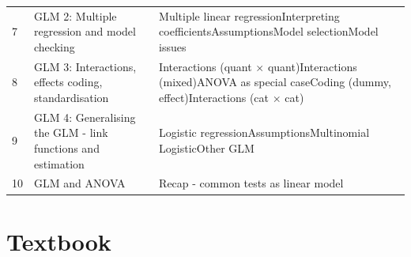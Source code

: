 \documentclass[]{book}
\begin{document}
\begin{longtable}[]{@{}lll@{}}
\begin{minipage}[t]{0.30\columnwidth}
7\strut
\end{minipage} & \begin{minipage}[t]{0.30\columnwidth}\raggedright
GLM 2: Multiple regression and model checking\strut
\end{minipage} & \begin{minipage}[t]{0.30\columnwidth}\raggedright
Multiple linear regressionInterpreting coefficientsAssumptionsModel selectionModel issues\strut
\end{minipage}\tabularnewline
\begin{minipage}[t]{0.30\columnwidth}\raggedright
8\strut
\end{minipage} & \begin{minipage}[t]{0.30\columnwidth}\raggedright
GLM 3: Interactions, effects coding, standardisation\strut
\end{minipage} & \begin{minipage}[t]{0.30\columnwidth}\raggedright
Interactions (quant \(\times\) quant)Interactions (mixed)ANOVA as special caseCoding (dummy, effect)Interactions (cat \(\times\) cat)\strut
\end{minipage}\tabularnewline
\begin{minipage}[t]{0.30\columnwidth}\raggedright
9\strut
\end{minipage} & \begin{minipage}[t]{0.30\columnwidth}\raggedright
GLM 4: Generalising the GLM - link functions and estimation\strut
\end{minipage} & \begin{minipage}[t]{0.30\columnwidth}\raggedright
Logistic regressionAssumptionsMultinomial LogisticOther GLM\strut
\end{minipage}\tabularnewline
\begin{minipage}[t]{0.30\columnwidth}\raggedright
10\strut
\end{minipage} & \begin{minipage}[t]{0.30\columnwidth}\raggedright
GLM and ANOVA\strut
\end{minipage} & \begin{minipage}[t]{0.30\columnwidth}\raggedright
Recap - common tests as linear model\strut
\end{minipage}\tabularnewline
\bottomrule
\end{longtable}

\hypertarget{textbook}{%
\section*{Textbook}\label{textbook}}
\end{document}
